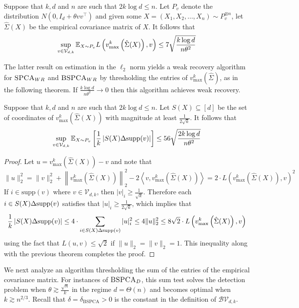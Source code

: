 \begin{theorem}
Suppose that $k, d$ and $n$ are such that $2k \log d \le n$. Let $P_v$ denote the distribution $N(0, I_d + \theta vv^\top)$ and given some $X = (X_1, X_2, \dots, X_n) \sim P_v^{\otimes n}$, let $\hat{\Sigma}(X)$ be the empirical covariance matrix of $X$. It follows that
$$\sup_{v \in \mathcal{V}_{d, k}} \mathbb{E}_{X \sim P_v} L\left( v^k_{\max}\left(\hat{\Sigma}(X)\right), v\right) \le 7 \sqrt{\frac{k \log d}{n\theta^2}}$$
\end{theorem}

The latter result on estimation in the $\ell_2$ norm yields a weak recovery algorithm for $\textsc{SPCA}_{WR}$ and $\textsc{BSPCA}_{WR}$ by thresholding the entries of $v^k_{\max}(\hat{\Sigma})$, as in the following theorem. If $\frac{k \log d}{n\theta^2} \to 0$ then this algorithm achieves weak recovery. 

\begin{theorem} \label{thm:weakrecspca}
Suppose that $k, d$ and $n$ are such that $2k \log d \le n$. Let $S(X) \subseteq [d]$ be the set of coordinates of $v^k_{\max}\left(\hat{\Sigma}(X) \right)$ with magnitude at least $\frac{1}{2\sqrt{k}}$. It follows that
$$\sup_{v \in \mathcal{V}_{d, k}} \mathbb{E}_{X \sim P_v} \left[\frac{1}{k} \left|S(X) \Delta \textnormal{supp}(v)\right| \right] \le 56 \sqrt{\frac{2k \log d}{n\theta^2}}$$
\end{theorem}

\begin{proof}
Let $u = v^k_{\max}\left(\hat{\Sigma}(X) \right) - v$ and note that
$$\| u \|_2^2 = \| v \|_2^2 + \left\| v^k_{\max}\left(\hat{\Sigma}(X) \right) \right\|_2^2 - 2 \left\langle v, v^k_{\max}\left(\hat{\Sigma}(X) \right) \right\rangle = 2 \cdot L\left( v^k_{\max}\left(\hat{\Sigma}(X)\right), v\right)^2$$
If $i \in \text{supp}(v)$ where $v \in \mathcal{V}_{d, k}$, then $|v|_i \ge \frac{1}{\sqrt{k}}$. Therefore each $i \in S(X) \Delta \textnormal{supp}(v)$ satisfies that $|u|_i \ge \frac{1}{2\sqrt{k}}$, which implies that
$$\frac{1}{k} \left|S(X) \Delta \textnormal{supp}(v) \right| \le 4 \cdot \sum_{i \in S(X) \Delta \textnormal{supp}(v)} |u|_i^2 \le 4 \| u \|_2^2 \le 8\sqrt{2} \cdot L\left( v^k_{\max}\left(\hat{\Sigma}(X)\right), v\right)$$
using the fact that $L(u, v) \le \sqrt{2}$ if $\| u \|_2 = \| v \|_2 = 1$. This inequality along with the previous theorem completes the proof.
\end{proof}

We next analyze an algorithm thresholding the sum of the entries of the empirical covariance matrix. For instances of $\textsc{BSPCA}_D$, this sum test solves the detection problem when $\theta \gtrsim \frac{\sqrt{n}}{k}$ in the regime $d = \Theta(n)$ and becomes optimal when $k \gtrsim n^{2/3}$. Recall that $\delta = \delta_{\text{BSPCA}} > 0$ is the constant in the definition of $\mathcal{BV}_{d, k}$.

